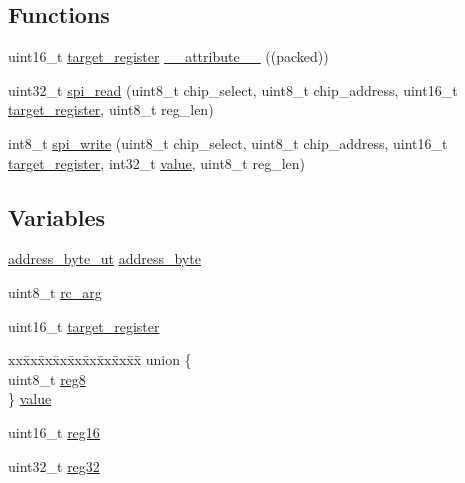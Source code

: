 \subsection*{Functions}
\begin{DoxyCompactItemize}
\item 
uint16\-\_\-t \hyperlink{a00041_ac02048009fa6718e40f028b6bae63f3d}{target\-\_\-register} \hyperlink{a00041_a93c867902b57f5986f7dc397bd28f600}{\-\_\-\-\_\-attribute\-\_\-\-\_\-} ((packed))
\item 
uint32\-\_\-t \hyperlink{a00007_ga7ad9f65ee46aca507374096506a0b1c4}{spi\-\_\-read} (uint8\-\_\-t chip\-\_\-select, uint8\-\_\-t chip\-\_\-address, uint16\-\_\-t \hyperlink{a00041_ac02048009fa6718e40f028b6bae63f3d}{target\-\_\-register}, uint8\-\_\-t reg\-\_\-len)
\begin{DoxyCompactList}\small\item\em 

 \end{DoxyCompactList}\item 
int8\-\_\-t \hyperlink{a00007_ga2770219ad8ad1eda1817c0df934b47d0}{spi\-\_\-write} (uint8\-\_\-t chip\-\_\-select, uint8\-\_\-t chip\-\_\-address, uint16\-\_\-t \hyperlink{a00041_ac02048009fa6718e40f028b6bae63f3d}{target\-\_\-register}, int32\-\_\-t \hyperlink{a00041_a638e4503e0ae6ce655b7ad2e17e8f0ad}{value}, uint8\-\_\-t reg\-\_\-len)
\end{DoxyCompactItemize}
\subsection*{Variables}
\begin{DoxyCompactItemize}
\item 
\hyperlink{a00011}{address\-\_\-byte\-\_\-ut} \hyperlink{a00041_af6a65bac733ea3e9b1d24b065163d49a}{address\-\_\-byte}
\item 
uint8\-\_\-t \hyperlink{a00041_aa11432305021ed2018866e1f8e990c34}{rc\-\_\-arg}
\item 
uint16\-\_\-t \hyperlink{a00041_ac02048009fa6718e40f028b6bae63f3d}{target\-\_\-register}
\item 
\begin{tabbing}
xx\=xx\=xx\=xx\=xx\=xx\=xx\=xx\=xx\=\kill
union \{\\
\>uint8\_t \hyperlink{a00041_a90b3f782e917edca7101e7803a3773b7}{reg8}\\
\} \hyperlink{a00041_a638e4503e0ae6ce655b7ad2e17e8f0ad}{value}\\

\end{tabbing}\item 
uint16\-\_\-t \hyperlink{a00041_a0c22d234d52e616d449a8c264bf2030b}{reg16}
\item 
uint32\-\_\-t \hyperlink{a00041_a83e2be8d3feb1bcbc286bfaae10ac552}{reg32}
\end{DoxyCompactItemize}


